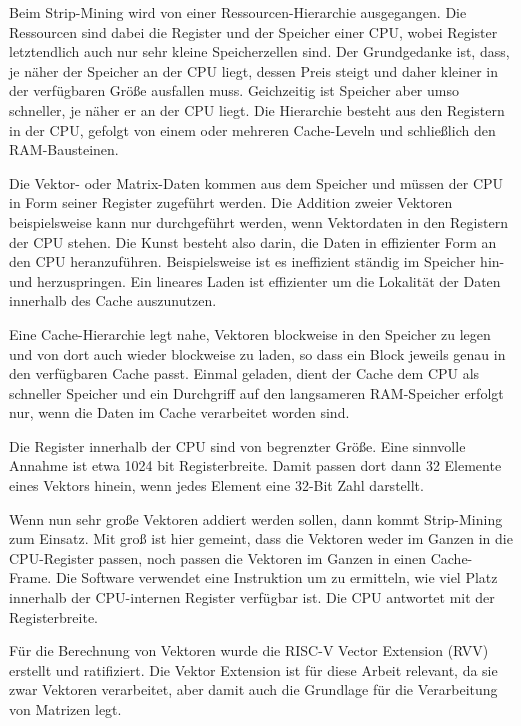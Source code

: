 Beim Strip-Mining wird von einer Ressourcen-Hierarchie ausgegangen. Die Ressourcen sind dabei die Register und der Speicher einer CPU, wobei Register letztendlich auch nur sehr kleine Speicherzellen sind. Der Grundgedanke ist, dass, je näher der Speicher an der CPU liegt, dessen Preis steigt und daher kleiner in der verfügbaren Größe ausfallen muss. Geichzeitig ist Speicher aber umso schneller, je näher er an der CPU liegt. Die Hierarchie besteht aus den Registern in der CPU, gefolgt von einem oder mehreren Cache-Leveln und schließlich den RAM-Bausteinen.

Die Vektor- oder Matrix-Daten kommen aus dem Speicher und müssen der CPU in Form seiner Register zugeführt werden. Die Addition zweier Vektoren beispielsweise kann nur durchgeführt werden, wenn Vektordaten in den Registern der CPU stehen. Die Kunst besteht also darin, die Daten in effizienter Form an den CPU heranzuführen. Beispielsweise ist es ineffizient ständig im Speicher hin- und herzuspringen. Ein lineares Laden ist effizienter um die Lokalität der Daten innerhalb des Cache auszunutzen.

Eine Cache-Hierarchie legt nahe, Vektoren blockweise in den Speicher zu legen und von dort auch wieder blockweise zu laden, so dass ein Block jeweils genau in den verfügbaren Cache passt. Einmal geladen, dient der Cache dem CPU als schneller Speicher und ein Durchgriff auf den langsameren RAM-Speicher erfolgt nur, wenn die Daten im Cache verarbeitet worden sind.

Die Register innerhalb der CPU sind von begrenzter Größe. Eine sinnvolle Annahme ist etwa 1024 bit Registerbreite. Damit passen dort dann 32 Elemente eines Vektors hinein, wenn jedes Element eine 32-Bit Zahl darstellt.

Wenn nun sehr große Vektoren addiert werden sollen, dann kommt Strip-Mining zum Einsatz. Mit groß ist hier gemeint, dass die Vektoren weder im Ganzen in die CPU-Register passen, noch passen die Vektoren im Ganzen in einen Cache-Frame. Die Software verwendet eine Instruktion um zu ermitteln, wie viel Platz innerhalb der CPU-internen Register verfügbar ist. Die CPU antwortet mit der Registerbreite.


Für die Berechnung von Vektoren wurde die RISC-V Vector Extension (\gls{RVV}) \cite{rvv_specification} erstellt und ratifiziert. Die Vektor Extension ist für diese Arbeit relevant, da sie zwar Vektoren verarbeitet, aber damit auch die Grundlage für die Verarbeitung von Matrizen legt.




